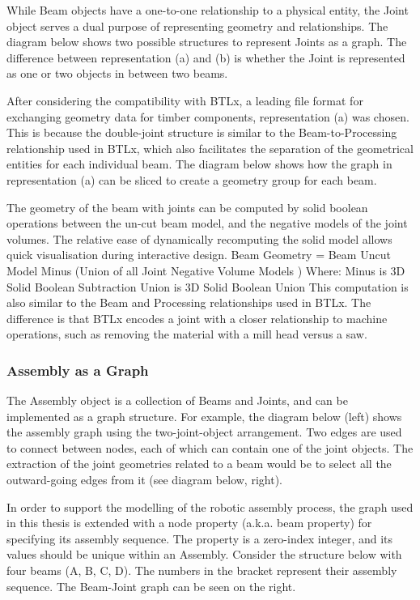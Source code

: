 While Beam objects have a one-to-one relationship to a physical entity, the Joint object serves a dual purpose of representing geometry and relationships. The diagram below shows two possible structures to represent Joints as a graph. The difference between representation (a) and (b) is whether the Joint is represented as one or two objects in between two beams.

After considering the compatibility with BTLx, a leading file format for exchanging geometry data for timber components, representation (a) was chosen. This is because the double-joint structure is similar to the Beam-to-Processing relationship used in BTLx, which also facilitates the separation of the geometrical entities for each individual beam. The diagram below shows how the graph in representation (a) can be sliced to create a geometry group for each beam.

The geometry of the beam with joints can be computed by solid boolean operations between the un-cut beam model, and the negative models of the joint volumes. The relative ease of dynamically recomputing the solid model allows quick visualisation during interactive design.
Beam Geometry = Beam Uncut Model Minus (Union of all Joint Negative Volume Models )
Where: 
Minus is 3D Solid Boolean Subtraction
Union is 3D Solid Boolean Union
This computation is also similar to the Beam and Processing relationships used in BTLx. The difference is that BTLx encodes a joint with a closer relationship to machine operations, such as removing the material with a mill head versus a saw.

\subsubsection{Assembly as a Graph}
\label{subsubsection:exploration_2_assembly_as_a_graph}

The Assembly object is a collection of Beams and Joints, and can be implemented as a graph structure. For example, the diagram below (left) shows the assembly graph using the two-joint-object arrangement. Two edges are used to connect between nodes, each of which can contain one of the joint objects. The extraction of the joint geometries related to a beam would be to select all the outward-going edges from it (see diagram below, right).

In order to support the modelling of the robotic assembly process, the graph used in this thesis is extended with a node property (a.k.a. beam property) for specifying its assembly sequence. The property is a zero-index integer, and its values should be unique within an Assembly. Consider the structure below with four beams (A, B, C, D). The numbers in the bracket represent their assembly sequence. The Beam-Joint graph can be seen on the right.


